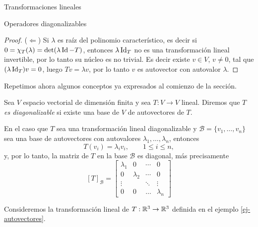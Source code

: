 \begin{chapter}{Transformaciones lineales}
\begin{section}{Operadores diagonalizables}
\begin{proof}
            ($\Leftarrow$) Si $\lambda$ es raíz del polinomio característico, es decir si $0 = \chi_T(\lambda) = \det(\lambda \operatorname{Id}-T)$, entonces $\lambda \operatorname{Id}_T$ no es una transformación lineal  invertible, por lo tanto  su núcleo es no trivial. Es decir existe $v \in V$, $v \ne 0$,  tal que $(\lambda \operatorname{Id}_T)v =0$, luego $Tv =\lambda v$, por lo tanto $v$ es autovector con autovalor $\lambda$.   
        \end{proof}
        
        Repetimos ahora algunos conceptos ya expresados al comienzo de la sección. 
        
        \begin{definicion}
            Sea $V$ espacio vectorial de dimensión finita y sea $T: V \to V$ lineal. Diremos que \textit{$T$ es diagonalizable} si existe una base de $V$ de autovectores de $T$. 
        \end{definicion}	
        
        En el caso que $T$ sea una transformación lineal diagonalizable y $\mathcal{B} = \{v_1,\ldots,v_n \}$ sea una base de autovectores con autovalores $\lambda_1,\ldots,\lambda_n$, entonces
        $$
        T(v_i) = \lambda_i v_i, \qquad 1 \le i \le n,
        $$ 
        y, por lo tanto, la matriz de $T$ en  la base $\mathcal{B}$ es diagonal, más precisamente
        $$
        [T]_\mathcal{B} = \begin{bmatrix}
        \lambda_1 &0 & \cdots & 0 \\
        0 & \lambda_2 & \cdots &0 \\
        \vdots & &\ddots & \vdots \\
        0 & 0 & \ldots &\lambda_n
        \end{bmatrix}
        $$
        
        \begin{ejemplo*} Consideremos la transformación lineal de $T:\mathbb R^3\to\mathbb R^3$  definida en el ejemplo \ref{ej-autovectores}.


\end{ejemplo*}
\end{section}
\end{chapter}

